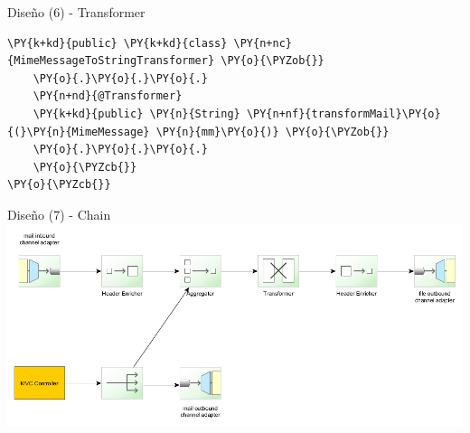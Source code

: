 \documentclass{beamer}
\begin{document}
\begin{frame}[fragile]{Diseño (6) - Transformer}
\begin{Verbatim}[fontsize=\tiny,commandchars=\\\{\}]
\PY{k+kd}{public} \PY{k+kd}{class} \PY{n+nc}{MimeMessageToStringTransformer} \PY{o}{\PYZob{}}
    \PY{o}{.}\PY{o}{.}\PY{o}{.}
    \PY{n+nd}{@Transformer}
    \PY{k+kd}{public} \PY{n}{String} \PY{n+nf}{transformMail}\PY{o}{(}\PY{n}{MimeMessage} \PY{n}{mm}\PY{o}{)} \PY{o}{\PYZob{}}
    \PY{o}{.}\PY{o}{.}\PY{o}{.}
    \PY{o}{\PYZcb{}}
\PY{o}{\PYZcb{}}
\end{Verbatim}
\end{frame}

\begin{frame}{Diseño (7) - Chain}
\includegraphics[width=1.0\linewidth]{sp-int-12b}
\end{frame}
\end{document}
